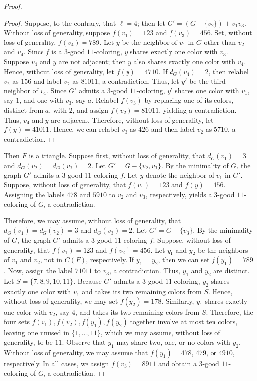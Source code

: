 \documentclass[12pt]{article}
\numberwithin{theorem}{section}
\numberwithin{conjecture}{section}
\numberwithin{corollary}{section}
\numberwithin{example}{section}
\numberwithin{lemma}{section}
\numberwithin{proposition}{section}
\numberwithin{problem}{section}
\numberwithin{remark}{section}
\numberwithin{claim}{theorem}
\numberwithin{definition}{section}
\begin{document}
\begin{proof}
\begin{proof}
Suppose, to the contrary, that $\ell= 4$; then let $G' = (G - \{v_2\}) + v_1v_3$. Without loss of generality, suppose $f(v_1) = 123$ and $f(v_3) = 456$. Set, without loss of generality, $f(v_4) = 789$. Let $y$ be the neighbor of $v_1$ in $G$ other than $v_2$ and $v_4$. Since $f$ is a $3$-good $11$-coloring, $y$ shares exactly one color with $v_3$. Suppose $v_4$ and $y$ are not adjacent; then $y$ also shares exactly one color with $v_4$. Hence, without loss of generality, let $f(y) = 4710$. If $d_G(v_4)=2$, then relabel $v_3$ as $156$ and label $v_2$ as $81011$, a contradiction. Thus, let $y'$ be the third neighbor of $v_4$. Since $G'$ admits a $3$-good $11$-coloring, $y'$ shares one color with $v_1$, say $1$, and one with $v_3$, say $a$. Relabel $f(v_3)$ by replacing one of its colors, distinct from $a$, with $2$, and assign $f(v_2)=81011$, yielding a contradiction. Thus, $v_4$ and $y$ are adjacent. Therefore, without loss of generality, let $f(y) = 41011$. Hence, we can relabel $v_3$ as $426$ and then label $v_2$ as $5710$, a contradiction.\end{proof}

\noindent Then $F$ is a triangle. Suppose first, without loss of generality, that $d_G(v_1)=3$ and $d_G(v_2)=d_G(v_3)=2$. Let $G' = G - \{v_2, v_3\}$. By the minimality of $G$, the graph $G'$ admits a $3$-good $11$-coloring $f$. Let $y$ denote the neighbor of $v_1$ in $G'$. Suppose, without loss of generality, that $f(v_1)=123$ and $f(y)=456$. Assigning the labels $478$ and $5910$ to $v_2$ and $v_3$, respectively, yields a $3$-good $11$-coloring of $G$, a contradiction.

\noindent Therefore, we may assume, without loss of generality, that $d_G(v_1)=d_G(v_2)=3$ and $d_G(v_3)=2$. Let $G' = G - \{v_3\}$. By the minimality of $G$, the graph $G'$ admits a $3$-good $11$-coloring $f$. Suppose, without loss of generality, that $f(v_1)=123$ and $f(v_2)=456$. Let $y_1$ and $y_2$ be the neighbors of $v_1$ and $v_2$, not in $C(F)$, respectively. If $y_1=y_2$, then we can set $f(y_1)=789$. Now, assign the label $71011$ to $v_3$, a contradiction. Thus, $y_1$ and $y_2$ are distinct. Let $S=\{7,8,9,10,11\}$. Because $G'$ admits a $3$-good $11$-coloring, $y_2$ shares exactly one color with $v_1$ and takes its two remaining colors from $S$. Hence, without loss of generality, we may set $f(y_2) = 178$. Similarly, $y_1$ shares exactly one color with $v_2$, say $4$, and takes its two remaining colors from $S$. Therefore, the four sets $f(v_1), f(v_2), f(y_1), f(y_2)$ together involve at most ten colors, leaving one unused in $\{1,\dots,11\}$, which we may assume, without loss of generality, to be $11$. Observe that $y_1$ may share two, one, or no colors with $y_2$. Without loss of generality, we may assume that $f(y_1) = 478$, $479$, or $4910$, respectively. In all cases, we assign $f(v_3) = 8911$ and obtain a $3$-good $11$-coloring of $G$, a contradiction.\end{proof}
\end{document}
